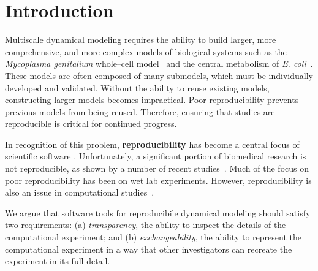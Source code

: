\documentclass[10pt,letterpaper]{article}
\begin{document}
\linenumbers

\section*{Introduction}


Multiscale dynamical modeling requires the ability to build larger, more comprehensive, and more complex models of biological systems such as the \textit{Mycoplasma genitalium} whole--cell model~\cite{karr2012whole} and the central metabolism of \textit{E. coli}~\cite{millard2017metabolic}. These models are often composed of many submodels, which must be individually developed and validated. Without the ability to reuse existing models, constructing larger models becomes impractical. Poor reproducibility prevents previous models from being reused. Therefore, ensuring that studies are reproducible is critical for continued progress.

In recognition of this problem, \textbf{reproducibility} has become a central focus of scientific software \cite{peng2011reproducible,sandve2013ten}.
Unfortunately, a significant portion of biomedical research is not reproducible, as shown by a number of recent studies~\cite{prinz2011believe,mobley2013survey}.
Much of the focus on poor reproducibility has been on wet lab experiments. However, reproducibility is also an issue in computational studies~\cite{peng2016moving,medley2016guidelines,mcdougal2016reproducibility,waltemath2016modeling}.


We argue that software tools for reproducibile dynamical modeling should satisfy two requirements: (a) \textit{transparency}, the ability to inspect the details of the computational experiment; and (b) \textit{exchangeability}, the ability to represent the computational experiment in a way that other investigators can recreate the experiment in its full detail.
\end{document}
